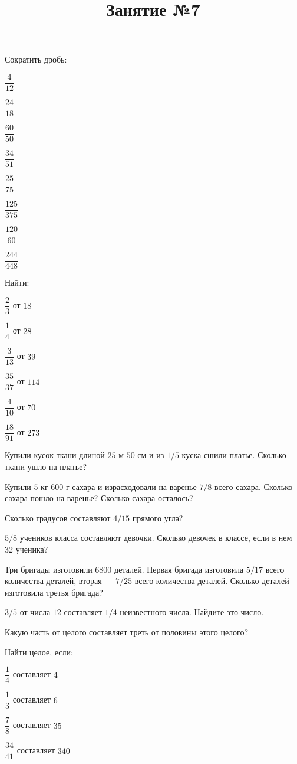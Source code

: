 %	
\newpage
\title{Занятие №7}
\begin{listofex}
	\item Сократить дробь:
	\begin{enumcols}[itemcolumns=4]
		\item \( \dfrac{4}{12} \)
		\item \( \dfrac{24}{18} \)
		\item \( \dfrac{60}{50} \)
		\item \( \dfrac{34}{51} \)
		\item \( \dfrac{25}{75} \)
		\item \( \dfrac{125}{375} \)
		\item \( \dfrac{120}{60} \)
		\item \( \dfrac{244}{448} \)
	\end{enumcols}
	\item Найти:
	\begin{enumcols}[itemcolumns=3]
		\item \( \dfrac{2}{3} \) от \( 18 \)
		\item \( \dfrac{1}{4} \) от \( 28 \)
		\item \( \dfrac{3}{13} \) от \( 39 \)
		\item \( \dfrac{35}{37} \) от \( 114 \)
		\item \( \dfrac{4}{10} \) от \( 70 \)
		\item \( \dfrac{18}{91} \) от \( 273 \)
	\end{enumcols}
	\item Купили кусок ткани длиной \( 25 \) м \( 50 \) см и из \( 1/5 \) куска сшили платье. Сколько ткани ушло на платье?
	\item Купили \( 5 \) кг \( 600 \) г сахара и израсходовали на варенье \( 7/8 \) всего сахара. Сколько сахара пошло на варенье? Сколько сахара осталось?
	\item Сколько градусов составляют \( 4/15 \) прямого угла?
	\item \( 5/8 \) учеников класса составляют девочки. Сколько девочек в классе, если в нем 32
	ученика?
	\item Три бригады изготовили 6800 деталей. Первая бригада изготовила  \( 5/17 \) всего количества деталей, вторая --- \( 7/25 \) всего количества деталей. Сколько деталей изготовила третья бригада?
	\item \( 3/5 \) от числа \( 12 \) составляет \( 1/4 \) неизвестного числа. Найдите это число.
	\item Какую часть от целого составляет треть от половины этого целого?
	\item Найти целое, если:
	\begin{enumcols}[itemcolumns=4]
		\item \( \dfrac{1}{4} \) составляет \( 4 \)
		\item \( \dfrac{1}{3} \) составляет \( 6 \)
		\item \( \dfrac{7}{8} \) составляет \( 35 \)
		\item \( \dfrac{34}{41} \) составляет \( 340 \)
	\end{enumcols}
\end{listofex}
